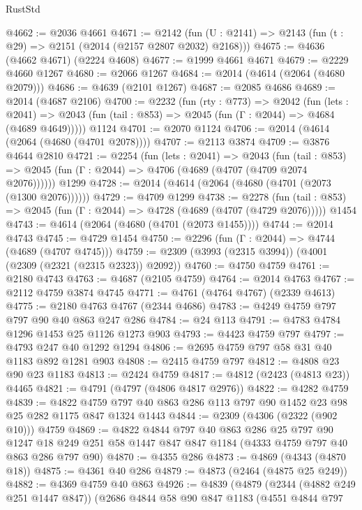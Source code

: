 \begin{lexlean}{RustStd}
\begin{coremodule}
@4662 := @2036 @4661
@4671 := @2142 (fun (U : @2141) => @2143 (fun (t : @29) => @2151 (@2014 (@2157 @2807 @2032) @2168)))
@4675 := @4636 (@4662 @4671) (@2224 @4608)
@4677 := @1999 @4661 @4671
@4679 := @2229 @4660 @1267
@4680 := @2066 @1267
@4684 := @2014 (@4614 (@2064 (@4680 @2079)))
@4686 := @4639 (@2101 @1267)
@4687 := @2085 @4686
@4689 := @2014 (@4687 @2106)
@4700 := @2232
    (fun (rty : @773) =>
    @2042
      (fun (lets : @2041) =>
      @2043 (fun (tail : @853) => @2045 (fun (Γ : @2044) => @4684 (@4689 @4649)))))
    @1124
@4701 := @2070 @1124
@4706 := @2014 (@4614 (@2064 (@4680 (@4701 @2078))))
@4707 := @2113 @3874
@4709 := @3876 @4644 @2810
@4721 := @2254
    (fun (lets : @2041) =>
    @2043
      (fun (tail : @853) => @2045 (fun (Γ : @2044) => @4706 (@4689 (@4707 (@4709 @2074 @2076))))))
    @1299
@4728 := @2014 (@4614 (@2064 (@4680 (@4701 (@2073 (@1300 @2076))))))
@4729 := @4709 @1299
@4738 := @2278
    (fun (tail : @853) => @2045 (fun (Γ : @2044) => @4728 (@4689 (@4707 (@4729 @2076)))))
    @1454
@4743 := @4614 (@2064 (@4680 (@4701 (@2073 @1455))))
@4744 := @2014 @4743
@4745 := @4729 @1454
@4750 := @2296 (fun (Γ : @2044) => @4744 (@4689 (@4707 @4745)))
@4759 := @2309 (@3993 (@2315 @3994)) (@4001 (@2309 (@2321 (@2315 @2323)) @2092))
@4760 := @4750 @4759
@4761 := @2180 @4743
@4763 := @4687 (@2105 @4759)
@4764 := @2014 @4763
@4767 := @2112 @4759 @3874 @4745
@4771 := @4761 (@4764 @4767) (@2339 @4613)
@4775 := @2180 @4763 @4767 (@2344 @4686)
@4783 := @4249 @4759 @797 @797 @90 @40 @863 @247 @286
@4784 := @24 @113
@4791 := @4783 @4784 @1296 @1453 @25 @1126 @1273 @903
@4793 := @4423 @4759 @797
@4797 := @4793 @247 @40 @1292 @1294
@4806 := @2695 @4759 @797 @58 @31 @40 @1183 @892 @1281 @903
@4808 := @2415 @4759 @797
@4812 := @4808 @23 @90 @23 @1183
@4813 := @2424 @4759
@4817 := @4812 (@2423 (@4813 @23)) @4465
@4821 := @4791 (@4797 (@4806 @4817 @2976))
@4822 := @4282 @4759
@4839 := @4822 @4759 @797 @40 @863 @286 @113 @797 @90 @1452 @23 @98 @25 @282 @1175 @847 @1324 @1443
@4844 := @2309 (@4306 (@2322 (@902 @10))) @4759
@4869 := @4822
    @4844
    @797
    @40
    @863
    @286
    @25
    @797
    @90
    @1247
    @18
    @249
    @251
    @58
    @1447
    @847
    @847
    @1184
    (@4333 @4759 @797 @40 @863 @286 @797 @90)
@4870 := @4355 @286
@4873 := @4869 (@4343 (@4870 @18))
@4875 := @4361 @40 @286
@4879 := @4873 (@2464 (@4875 @25 @249))
@4882 := @4369 @4759 @40 @863
@4926 := @4839
    (@4879
      (@2344 (@4882 @249 @251 @1447 @847))
      (@2686
        @4844
        @58
        @90
        @847
        @1183
        (@4551
          @4844
          @797

\end{coremodule}
\end{lexlean}

